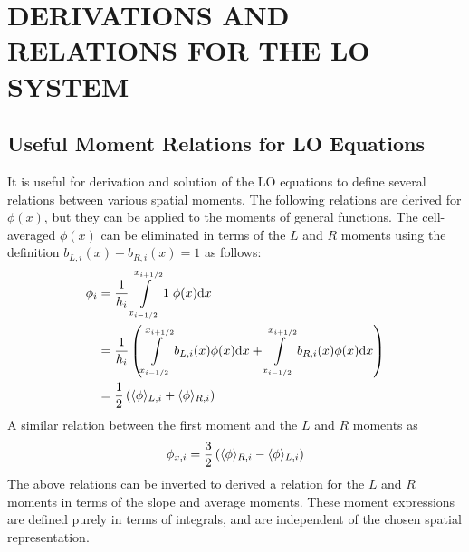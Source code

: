 %
%
%



\chapter{\uppercase{Derivations and Relations for the LO System}}

\section{Useful Moment Relations for LO Equations}
\label{app:lo_mom_relations}

It is useful for derivation and solution of the LO equations to define  several relations between various spatial moments. 
The following relations are derived for $\phi(x)$,
but they can be applied to the moments of general functions.  The cell-averaged $\phi(x)$ 
can be eliminated in terms of the $L$ and $R$ moments using the definition
$b_{L,i}(x)+b_{R,i}(x)=1$ as follows:
\begin{align}\label{app:atoL}
    \phi_{i} &= \frac{1}{h_i} \int\limits_{{x_{i-1/2}}}^{{x_{i+1/2}}} 1 \;\phi(x) \mathrm{d} x \\
             &= \frac{1}{h_i} \left(\int\limits_{{x_{i-1/2}}}^{{x_{i+1/2}}} b_{L,i}(x) \phi(x) \mathrm{d} x +
             \int\limits_{{x_{i-1/2}}}^{{x_{i+1/2}}} b_{R,i}(x) \phi(x) \mathrm{d} x \right)\\
             &= \frac{1}{2} \left( \langle \phi \rangle_{L,i} + \langle \phi \rangle_{R,i} \right)
\end{align}
A similar relation between the first moment and the $L$ and $R$ moments as
\begin{equation}
    {\phi}_{x,i} = \frac{3}{2} \left(\langle \phi \rangle_{R,i} - \langle \phi \rangle_{L,i}\right)
\end{equation}
The above relations can be inverted to derived a relation for the $L$ and $R$ moments in terms of the slope
and average moments.  These moment expressions are defined purely in terms of integrals,
and are independent of the chosen spatial representation.

